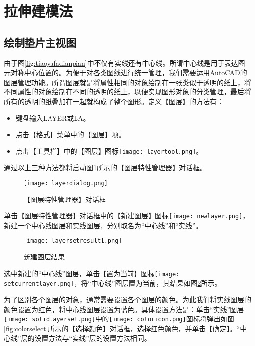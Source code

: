 \section{拉伸建模法}
\subsection{绘制垫片主视图}\label{sec:dianpian}
\begin{procedure}
\item 由于图\ref{fig:tiaoyafadianpian}中不仅有实线还有中心线。所谓中心线是用于表达图元对称中心位置的。为便于对各类图线进行统一管理，我们需要运用AutoCAD的图层管理功能。所谓图层就是将属性相同的对象绘制在一张类似于透明的纸上，将不同属性的对象绘制在不同的透明的纸上，以便实现图形对象的分类管理，最后将所有的透明的纸叠加在一起就构成了整个图形。定义【图层】的方法有：
\begin{itemize}
\item 键盘输入LAYER或LA。
\item 点击【格式】菜单中的【图层】项。
\item 点击【工具栏】中的【图层】图标\texttt{[image: layertool.png]}。
\end{itemize}
通过以上三种方法都将启动图\ref{fig:layerdialog}所示的【图层特性管理器】对话框。
\begin{figure}[htbp]
\centering
\texttt{[image: layerdialog.png]}
\caption{【图层特性管理器】对话框}\label{fig:layerdialog}
\end{figure}

单击【图层特性管理器】对话框中的【新建图层】图标\texttt{[image: newlayer.png]}，新建一个中心线图层和实线图层，分别取名为“中心线”和“实线”。

\begin{figure}[htbp]
\centering
\texttt{[image: layersetresult1.png]}
\caption{新建图层结果}\label{fig:layersetresult1}
\end{figure}

选中新建的“中心线”图层，单击【置为当前】图标\texttt{[image: setcurrentlayer.png]}，将“中心线”图层置为当前，其结果如图\ref{fig:layersetresult1}所示。

为了区别各个图层的对象，通常需要设置各个图层的颜色。为此我们将实线图层的颜色设置为红色，将中心线图层设置为蓝色。具体设置方法是：单击“实线”图层\texttt{[image: solidlayerset.png]}中的\texttt{[image: coloricon.png]}图标将弹出如图\ref{fig:colorselect}所示的【选择颜色】对话框，选择红色颜色，并单击【确定】。“中心线”层的设置方法与“实线”层的设置方法相同。


\end{procedure}
